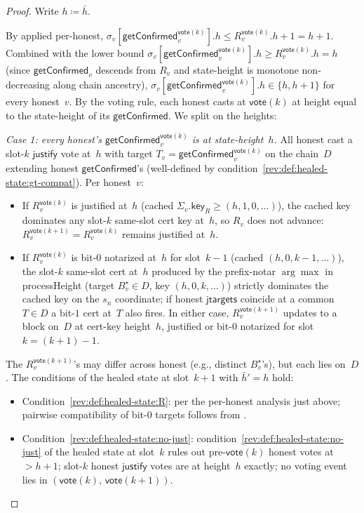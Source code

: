 \ifx\litemode\undefined\documentclass{article}\fi
\newcommand{\just}{\ensuremath{\mathsf{justify}}\xspace}
\newcommand{\jtargets}{\mathsf{jtargets}}
\newcommand{\key}{\mathsf{key}}
\newcommand{\vote}{\mathsf{vote}}
\newcommand{\comm}[1]{\bar{#1}}
\newcommand{\processHeight}{\textsf{processHeight}\xspace}
\newcommand{\getConfirmed}{\textsf{getConfirmed}\xspace}
\theoremstyle{plain}
\theoremstyle{definition}
\theoremstyle{remark}
\begin{document}
\begin{proof}
Write $h \coloneqq \comm{h}$.

By  applied per-honest, $\sigma_v[\getConfirmed_v^{\vote(k)}].h \leq R_v^{\vote(k)}.h + 1 = h + 1$. Combined with the lower bound $\sigma_v[\getConfirmed_v^{\vote(k)}].h \geq R_v^{\vote(k)}.h = h$ (since $\getConfirmed_v$ descends from $R_v$ and state-height is monotone non-decreasing along chain ancestry), $\sigma_v[\getConfirmed_v^{\vote(k)}].h \in \{h, h+1\}$ for every honest~$v$. By the voting rule, each honest casts at $\vote(k)$ at height equal to the state-height of its $\getConfirmed$. We split on the heights:

\emph{Case 1: every honest's $\getConfirmed_v^{\vote(k)}$ is at state-height~$h$.}
All honest cast a slot-$k$ \just vote at~$h$ with target $T_v = \getConfirmed_v^{\vote(k)}$ on the chain~$D$ extending honest $\getConfirmed$'s (well-defined by condition~\ref{rev:def:healed-state:gt-compat}). Per honest~$v$:
\begin{itemize}
  \item If $R_v^{\vote(k)}$ is justified at~$h$ (cached $\Sigma_v.\key_R \geq (h, 1, 0, \ldots)$), the cached key dominates any slot-$k$ same-slot cert key at~$h$, so $R_v$ does not advance: $R_v^{\vote(k+1)} = R_v^{\vote(k)}$ remains justified at~$h$.
  \item If $R_v^{\vote(k)}$ is bit-$0$ notarized at~$h$ for slot~$k-1$ (cached $(h, 0, k-1, \ldots)$), the slot-$k$ same-slot cert at~$h$ produced by the prefix-notar $\arg\max$ in \processHeight{} (target $B^\star_v \in D$, key $(h, 0, k, \ldots)$) strictly dominates the cached key on the $s_n$ coordinate; if honest $\jtargets$ coincide at a common $T \in D$ a bit-$1$ cert at~$T$ also fires. In either case, $R_v^{\vote(k+1)}$ updates to a block on~$D$ at cert-key height~$h$, justified or bit-$0$ notarized for slot~$k = (k+1)-1$.
\end{itemize}
The $R_v^{\vote(k+1)}$'s may differ across honest (e.g., distinct $B^\star_v$'s), but each lies on~$D$. The conditions of the healed state at slot~$k+1$ with $\comm{h}' = h$ hold:
\begin{itemize}
  \item Condition~\ref{rev:def:healed-state:R}: per the per-honest analysis just above; pairwise compatibility of bit-$0$ targets follows from .
  \item Condition~\ref{rev:def:healed-state:no-just}: condition~\ref{rev:def:healed-state:no-just} of the healed state at slot~$k$ rules out pre-$\vote(k)$ honest votes at~$>h+1$; slot-$k$ honest \just votes are at height~$h$ exactly; no voting event lies in $(\vote(k),\, \vote(k+1))$.

\end{itemize}
\end{proof}
\end{document}

